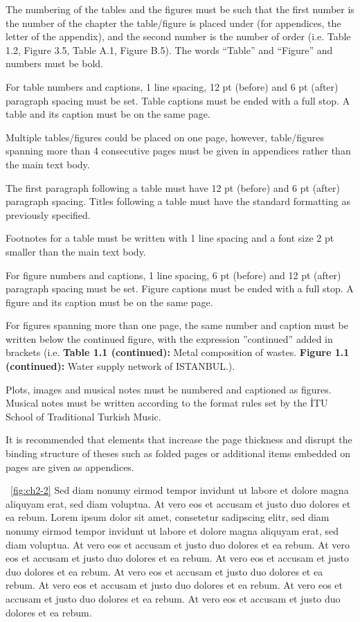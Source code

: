 The numbering of the tables and the figures must be such that the first number is the number of the chapter the table/figure is placed under (for appendices, the letter of the appendix), and the second number is the number of order (i.e. Table 1.2, Figure 3.5, Table A.1, Figure B.5). The words “Table” and “Figure” and numbers must be bold.

For table numbers and captions, 1 line spacing, 12 pt (before) and 6 pt (after) paragraph spacing must be set. Table captions must be ended with a full stop. A table and its caption must be on the same page. 

Multiple tables/figures could be placed on one page, however, table/figures spanning more than 4 consecutive pages must be given in appendices rather than the main text body.

The first paragraph following a table must have 12 pt (before) and 6 pt (after) paragraph spacing. Titles following a table must have the standard formatting as previously specified. 

Footnotes for a table must be written with 1 line spacing and a font size 2 pt smaller than the main text body. 

For figure numbers and captions, 1 line spacing, 6 pt (before) and 12 pt (after) paragraph spacing must be set. Figure captions must be ended with a full stop. A figure and its caption must be on the same page. 

For figures spanning more than one page, the same number and caption must be written below the continued figure, with the expression ”continued” added in brackets (i.e. \textbf{Table 1.1 (continued):} Metal composition of wastes. \textbf{Figure 1.1 (continued):} Water supply network of ISTANBUL.).

Plots, images and musical notes must be numbered and captioned as figures. Musical notes must be written according to the format rules set by the İTU School of Traditional Turkish Music. 

It is recommended that elements that increase the page thickness and disrupt the binding structure of theses such as  folded pages or additional items embedded on pages are given as appendices.

\figurename\ \ref{fig:ch2-2} Sed diam nonumy eirmod tempor invidunt ut labore et dolore magna aliquyam erat, sed diam voluptua. At vero eos et accusam et justo duo dolores et ea rebum. Lorem ipsum dolor sit amet, consetetur sadipscing elitr, sed diam nonumy eirmod tempor invidunt ut labore et dolore magna aliquyam erat, sed diam voluptua. At vero eos et accusam et justo duo dolores et ea rebum. At vero eos et accusam et justo duo dolores et ea rebum. At vero eos et accusam et justo duo dolores et ea rebum. At vero eos et accusam et justo duo dolores et ea rebum. At vero eos et accusam et justo duo dolores et ea rebum. At vero eos et accusam et justo duo dolores et ea rebum. At vero eos et accusam et justo duo dolores et ea rebum.

